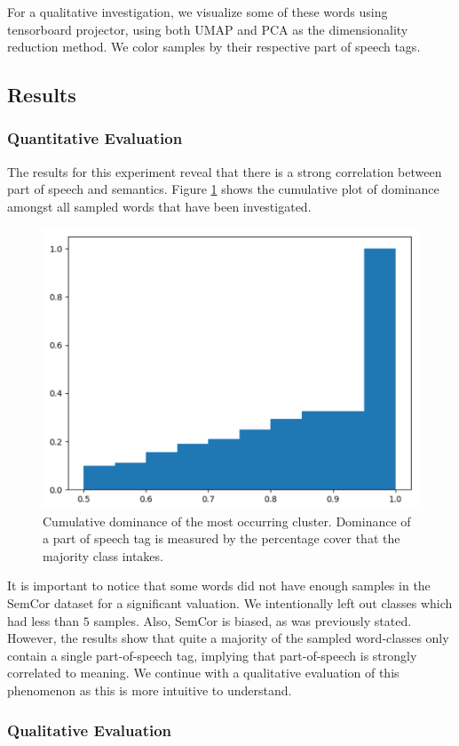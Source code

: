 \documentclass[a4paper,12pt,oneside,openright]{report}
\begin{document}
For a qualitative investigation, we visualize some of these words using tensorboard projector, using both UMAP and PCA as the dimensionality reduction method.
We color samples by their respective part of speech tags.

\subsection{Results}

\subsubsection{Quantitative Evaluation}

The results for this experiment reveal that there is a strong correlation between part of speech and semantics.
Figure \ref{fig:POS_dominance} shows the cumulative plot of dominance amongst all sampled words that have been investigated.

\begin{figure}[H]
	\center
  \includegraphics[width=0.5\linewidth]{./assets/experiments/pos_dominance_calculation.png}
  \caption{Cumulative dominance of the most occurring cluster. Dominance of a part of speech tag is measured by the percentage cover that the majority class intakes.}
  \label{fig:POS_dominance}
\end{figure}

It is important to notice that some words did not have enough samples in the SemCor dataset for a significant valuation. 
We intentionally left out classes which had less than $5$ samples.
Also, SemCor is biased, as was previously stated.
However, the results show that quite a majority of the sampled word-classes only contain a single part-of-speech tag, implying that part-of-speech is strongly correlated to meaning.
We continue with a qualitative evaluation of this phenomenon as this is more intuitive to understand.

\subsubsection{Qualitative Evaluation}
\end{document}
